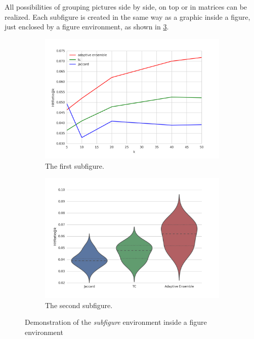 All possibilities of grouping pictures side by side, on top or in matrices can be realized. Each subfigure is created in the same way as a graphic inside a figure, just enclosed by a figure environment, as shown in \cref{fig:example:subfigures}.
\begin{figure}[htb]
  \begin{subfigure}[b]{.45\linewidth}
    \centering
    \includegraphics[width=0.95\linewidth]{images/hitratio_line.png}
    \caption{The first subfigure.}
    \label{fig:example:subfigures:a}
  \end{subfigure}%
  \begin{subfigure}[b]{.45\linewidth}
    \centering
    \includegraphics[width=0.95\linewidth]{images/hitratio_violin.png}
    \caption{The second subfigure.}
    \label{fig:example:subfigures:b}
  \end{subfigure}
  \caption{Demonstration of the \emph{subfigure} environment inside a figure environment}
  \label{fig:example:subfigures}
\end{figure}



